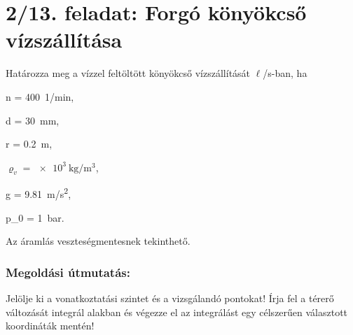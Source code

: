 \section*{2/13. feladat: Forgó könyökcső vízszállítása}
Határozza meg a vízzel feltöltött könyökcső vízszállítását $\ell$/s-ban, ha

n = \SI{400}{1/\minute},

d = \SI{30}{\mm},

r = \SI{0,2}{\m},

$\varrho_{v} = \SI{e3}{\kilogram/\meter\cubed} $,

g = \SI{9,81}{\meter/\second\squared},

p_{0} = \SI{1}{\bar}.

\vspace{2mm}

\noindent Az áramlás veszteségmentesnek tekinthető.

\subsubsection*{ Megoldási útmutatás:}

\vspace{2mm}

\begin{flushleft}
	Jelölje ki a vonatkoztatási szintet és a vizsgálandó pontokat!
	Írja fel a térerő változását integrál alakban és végezze el az integrálást egy célszerűen választott koordináták mentén!
\end{flushleft}

\noindent\hrulefill
